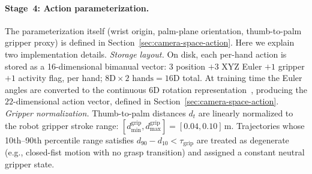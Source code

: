 \paragraph{Stage~4: Action parameterization.}
The parameterization itself (wrist origin, palm-plane orientation,
thumb-to-palm gripper proxy) is defined in
Section~\ref{sec:camera-space-action}. Here we explain two implementation
details. \emph{Storage layout.} On disk, each per-hand action is stored as
a 16-dimensional bimanual vector: $3$ position $+ 3$ XYZ Euler $+ 1$
gripper $+ 1$ activity flag, per hand; $8\text{D} \times 2\text{ hands} = 16\text{D}$ total. At training time the Euler angles
are converted to the continuous 6D rotation
representation~\cite{zhou2019continuity}, producing the $22$-dimensional
action vector, defined in Section~\ref{sec:camera-space-action}.
\emph{Gripper normalization.} Thumb-to-palm distances $d_t$ are linearly
normalized to the robot gripper stroke range: 
$[d_{\min}^{\mathrm{grip}}, d_{\max}^{\mathrm{grip}}]
= [0.04, 0.10]\,\mathrm{m}$. Trajectories whose 10th--90th percentile range
satisfies $d_{90} - d_{10} < \tau_{\mathrm{grip}}$ are treated as
degenerate (e.g., closed-fist motion with no grasp transition) and assigned
a constant neutral gripper state.

